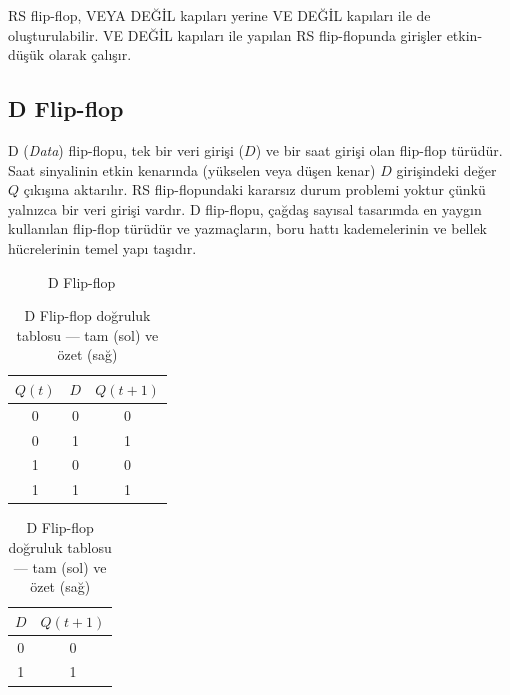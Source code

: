 RS flip-flop, VEYA DEĞİL kapıları yerine VE DEĞİL kapıları ile de oluşturulabilir. VE DEĞİL kapıları ile yapılan RS flip-flopunda girişler etkin-düşük olarak çalışır.


\subsection{D Flip-flop}

D (\emph{Data}) flip-flopu, tek bir veri girişi ($D$) ve bir saat girişi olan flip-flop türüdür. Saat sinyalinin etkin kenarında (yükselen veya düşen kenar) $D$ girişindeki değer $Q$ çıkışına aktarılır. RS flip-flopundaki kararsız durum problemi yoktur çünkü yalnızca bir veri girişi vardır. D flip-flopu, çağdaş sayısal tasarımda en yaygın kullanılan flip-flop türüdür ve yazmaçların, boru hattı kademelerinin ve bellek hücrelerinin temel yapı taşıdır.

\begin{figure}[H]
\centering
{}
\caption{D Flip-flop}
\label{fig:B.25}
\end{figure}

\begin{table}[H]
\centering
\caption{D Flip-flop doğruluk tablosu — tam (sol) ve özet (sağ)}
\label{tab:B.13}
\begin{tabular}{cc|c}
\toprule
$Q(t)$ & $D$ & $Q(t+1)$ \\
\midrule
0 & 0 & 0 \\
0 & 1 & 1 \\
1 & 0 & 0 \\
1 & 1 & 1 \\
\bottomrule
\end{tabular}
\hspace{1.5cm}
\begin{tabular}{c|c}
\toprule
$D$ & $Q(t+1)$ \\
\midrule
0 & 0 \\
1 & 1 \\
\bottomrule
\end{tabular}
\end{table}

